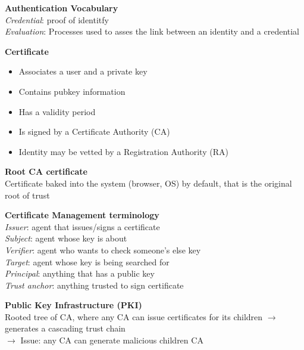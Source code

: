 \documentclass[10pt,letterpaper,landscape]{report}
\newcommand{\boxheight}{21.59cm}
\newcommand{\boxwidth}{8.85cm}
\begin{document}
\begin{small}
{\begin{minipage}[t][\boxheight][c]{\boxwidth}
	\textbf{Authentication Vocabulary}\\
	\textit{Credential}: proof of identitfy\\
	\textit{Evaluation}: Processes used to asses the link between an identity and a credential
	
	\textbf{Certificate}
	\begin{itemize}
		\item Associates a user and a private key
		\item Contains pubkey information
		\item Has a validity period
		\item Is signed by a Certificate Authority (CA)
		\item Identity may be vetted by a Registration Authority (RA)
	\end{itemize}

	\textbf{Root CA certificate}\\
	Certificate baked into the system (browser, OS) by default, that is the original root of trust
	
	\textbf{Certificate Management terminology}\\
	\textit{Issuer}: agent that issues/signs a certificate\\
	\textit{Subject}: agent whose key is about\\
	\textit{Verifier}: agent who wants to check someone's else key\\
	\textit{Target}: agent whose key is being searched for\\
	\textit{Principal}: anything that has a public key\\
	\textit{Trust anchor}: anything trusted to sign certificate
	
	\textbf{Public Key Infrastructure (PKI)}\\
	Rooted tree of CA, where any CA can issue certificates for its children $\rightarrow$ generates a cascading trust chain\\
	$\rightarrow$ Issue: any CA can generate malicious children CA
	

\end{minipage}}
\end{small}
\end{document}
